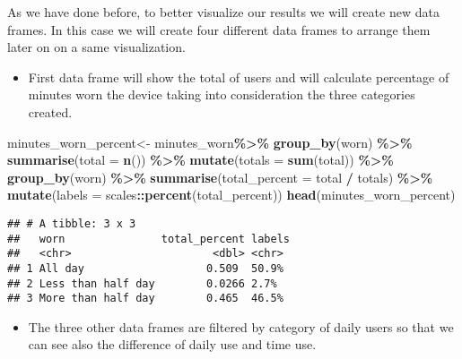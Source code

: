 \documentclass[
]{article}
\newenvironment{Shaded}{\begin{snugshade}}{\end{snugshade}}
\newcommand{\AttributeTok}[1]{\textcolor[rgb]{0.13,0.29,0.53}{#1}}
\newcommand{\FunctionTok}[1]{\textcolor[rgb]{0.13,0.29,0.53}{\textbf{#1}}}
\newcommand{\NormalTok}[1]{#1}
\newcommand{\OtherTok}[1]{\textcolor[rgb]{0.56,0.35,0.01}{#1}}
\newcommand{\SpecialCharTok}[1]{\textcolor[rgb]{0.81,0.36,0.00}{\textbf{#1}}}
\providecommand{\tightlist}{%
  \setlength{\itemsep}{0pt}\setlength{\parskip}{0pt}}
\begin{document}
As we have done before, to better visualize our results we will create
new data frames. In this case we will create four different data frames
to arrange them later on on a same visualization.

\begin{itemize}
\tightlist
\item
  First data frame will show the total of users and will calculate
  percentage of minutes worn the device taking into consideration the
  three categories created.
\end{itemize}

\begin{Shaded}
\begin{Highlighting}[]
\NormalTok{minutes\_worn\_percent}\OtherTok{\textless{}{-}}\NormalTok{ minutes\_worn}\SpecialCharTok{\%\textgreater{}\%}
  \FunctionTok{group\_by}\NormalTok{(worn) }\SpecialCharTok{\%\textgreater{}\%}
  \FunctionTok{summarise}\NormalTok{(}\AttributeTok{total =} \FunctionTok{n}\NormalTok{()) }\SpecialCharTok{\%\textgreater{}\%}
  \FunctionTok{mutate}\NormalTok{(}\AttributeTok{totals =} \FunctionTok{sum}\NormalTok{(total)) }\SpecialCharTok{\%\textgreater{}\%}
  \FunctionTok{group\_by}\NormalTok{(worn) }\SpecialCharTok{\%\textgreater{}\%}
  \FunctionTok{summarise}\NormalTok{(}\AttributeTok{total\_percent =}\NormalTok{ total }\SpecialCharTok{/}\NormalTok{ totals) }\SpecialCharTok{\%\textgreater{}\%}
  \FunctionTok{mutate}\NormalTok{(}\AttributeTok{labels =}\NormalTok{ scales}\SpecialCharTok{::}\FunctionTok{percent}\NormalTok{(total\_percent))}
\FunctionTok{head}\NormalTok{(minutes\_worn\_percent)}
\end{Highlighting}
\end{Shaded}

\begin{verbatim}
## # A tibble: 3 x 3
##   worn               total_percent labels
##   <chr>                      <dbl> <chr> 
## 1 All day                   0.509  50.9% 
## 2 Less than half day        0.0266 2.7%  
## 3 More than half day        0.465  46.5%
\end{verbatim}

\begin{itemize}
\tightlist
\item
  The three other data frames are filtered by category of daily users so
  that we can see also the difference of daily use and time use.
\end{itemize}
\end{document}
